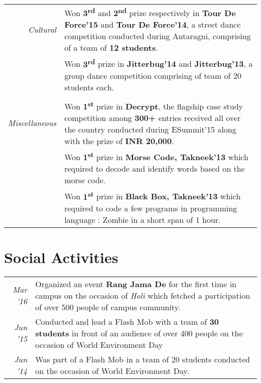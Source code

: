\documentclass[a4paper]{norm-resume}
\begin{document}
	\begin{tabular}{r|p{16cm}}	
	
	\null \hspace{10mm} \normalsize\emph{Cultural} & \small{Won \textbf{3\textsuperscript{rd}} and \textbf{2\textsuperscript{nd}} prize respectively in \textbf{Tour De Force’15} and \textbf{Tour De Force’14}, a street dance competition conducted during Antaragni, comprising of a team of \textbf{12 students}.}\\
	& \small{ Won \textbf{3\textsuperscript{rd}} prize in \textbf{Jitterbug’14} and \textbf{Jitterbug’13}, a group dance competition comprising of team of 20 students each.} \\

	\multicolumn{2}{c}{} \\
	\normalsize\emph{Miscellaneous} & \small{Won \textbf{1\textsuperscript{st}} prize in \textbf{Decrypt}, the flagship case study competition among \textbf{300+} entries received all over the country conducted during ESummit'15 along with the prize of \textbf{INR 20,000}.}\\
	& \small{Won \textbf{1\textsuperscript{st}} prize in \textbf{Morse Code, Takneek’13} which required to decode and identify words based on the morse code.} \\
	& \small{ Won \textbf{1\textsuperscript{st}} prize in \textbf{Black Box, Takneek’13} which required to code a few programs in programming language : Zombie in a short span of 1 hour.} \\
	\end{tabular}

\vspace{1mm}	%


\section{Social Activities}
\vspace{2mm}
\begin{tabular}{r|p{16cm}}	
	
	\null \hspace{10mm} \normalsize\emph{Mar '16} & \small{Organized an event \textbf{Rang Jama De} for the first time in campus on the occasion of \textit{Holi} which fetched a participation of over 500 people of campus community.}\\
	\normalsize\emph{Jun '15} & \small{Conducted and lead a Flash Mob with a team of \textbf{30 students} in front of an audience of over 400 people on the occasion of World Environment Day}\\
	\normalsize\emph{Jun '14} & \small{Was part of a Flash Mob in a team of 20 students conducted on the occasion of World Environment Day.} \\
	\end{tabular}
\end{document}
